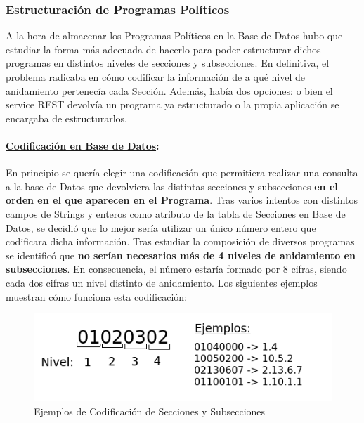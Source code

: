 	\subsubsection{Estructuración de Programas Políticos}\label{sssec:politicalProgramArch}

		A la hora de almacenar los Programas Políticos en la Base de Datos hubo que estudiar la forma más adecuada de hacerlo para poder estructurar dichos programas en distintos niveles de secciones y subsecciones. En definitiva, el problema radicaba en cómo codificar la información de a qué nivel de anidamiento pertenecía cada Sección. Además, había dos opciones: o bien el service REST devolvía un programa ya estructurado o la propia aplicación se encargaba de estructurarlos. \\
		
		\paragraph{\underline{Codificación en Base de Datos}:} 
		
		En principio se quería elegir una codificación que permitiera realizar una consulta a la base de Datos que devolviera las distintas secciones y subsecciones \textbf{en el orden en el que aparecen en el Programa}. Tras varios intentos con distintos campos de Strings y enteros como atributo de la tabla de Secciones en Base de Datos, se decidió que lo mejor sería utilizar un único número entero que codificara dicha información. Tras estudiar la composición de diversos programas se identificó que \textbf{no serían necesarios más de 4 niveles de anidamiento en subsecciones}. En consecuencia, el número estaría formado por 8 cifras, siendo cada dos cifras un nivel distinto de anidamiento. Los siguientes ejemplos muestran cómo funciona esta codificación:
		
	\begin{figure}[H]
	  \centering
	    \includegraphics[keepaspectratio, scale=0.8]{Media/Captures/sectionsCodification.png}
	  \caption{Ejemplos de Codificación de Secciones y Subsecciones}
	  \label{fig:secCodification}
	\end{figure}	
	
